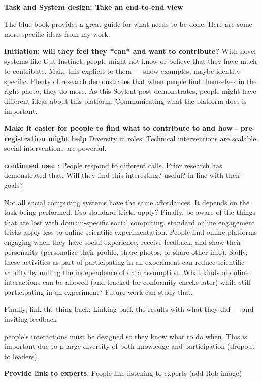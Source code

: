 \textbf{Task and System design: Take an end-to-end view}

The blue book provides a great guide for what needs to be done. Here are some more specific ideas from my work.

\textbf{Initiation: will they feel they *can* and want to contribute?} With novel systems like Gut Instinct, people might not know or believe that they have much to contribute. Make this explicit to them — show examples, maybe identity-specific. Plenty of research demonstrates that when people find themselves in the right photo, they do more. As this Soylent post demonstrates, people might have different ideas about this platform. Communicating what the platform does is important.

\textbf{Make it easier for people to find what to contribute to and how - pre-registration might help} Diversity in roles: Technical interventions are scalable, social interventions are powerful. 

\textbf{continued use: }:  People respond to different calls. Prior research has demonstrated that. Will they find this interesting? useful? in line with their goals?

Not all social computing systems have the same affordances. It depends on the task being performed. Dso standard tricks apply? Finally, be aware of the things that are lost with domain-specific social computing. standard online engagement tricks apply less to online scientific experimentation. People find online platforms engaging when they have social experience, receive feedback, and show their personality (personalize their profile, share photos, or share other info). Sadly, these activities as part of participating in an experiment can reduce scientific validity by nulling the independence of data assumption. What kinds of online interactions can be allowed (and tracked for conformity checks later) while still participating in an experiment? Future work can study that.

Finally, link the thing back: Linking back the results with what they did — and inviting feedback 

people’s interactions must be designed so they know what to do when. This is important due to a large diversity of both knowledge and participation  (dropout to leaders). 

\textbf{Provide link to experts}: People like listening to experts (add Rob image)





